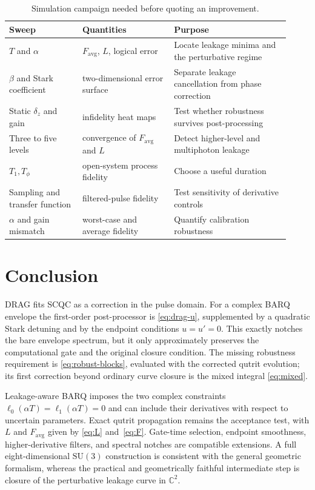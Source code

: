 \documentclass[11pt,a4paper]{article}
\theoremstyle{definition}
\begin{document}
\begin{table}[ht]
\centering
\caption{Simulation campaign needed before quoting an improvement.}
\label{tab:campaign}
{\small
\begin{tabular}{@{}>{\raggedright\arraybackslash}p{0.24\linewidth}>{\raggedright\arraybackslash}p{0.30\linewidth}>{\raggedright\arraybackslash}p{0.38\linewidth}@{}}
\toprule
Sweep & Quantities & Purpose \\
\midrule
\(T\) and \(\alpha\) & \(F_{\mathrm{avg}}\), \(L\), logical error &
  Locate leakage minima and the perturbative regime \\
\(\beta\) and Stark coefficient & two-dimensional error surface &
  Separate leakage cancellation from phase correction \\
Static \(\delta_z\) and gain & infidelity heat maps &
  Test whether robustness survives post-processing \\
Three to five levels & convergence of \(F_{\mathrm{avg}}\) and \(L\) &
  Detect higher-level and multiphoton leakage \\
\(T_1,T_\phi\) & open-system process fidelity &
  Choose a useful duration \\
Sampling and transfer function & filtered-pulse fidelity &
  Test sensitivity of derivative controls \\
\(\alpha\) and gain mismatch & worst-case and average fidelity &
  Quantify calibration robustness \\
\bottomrule
\end{tabular}}
\end{table}

\section{Conclusion}

DRAG fits SCQC as a correction in the pulse domain.  For a complex BARQ
envelope the first-order post-processor is \eqref{eq:drag-u}, supplemented by
a quadratic Stark detuning and by the endpoint conditions \(u=u'=0\).  This
exactly notches the bare envelope spectrum, but it only approximately preserves
the computational gate and the original closure condition.  The missing
robustness requirement is \eqref{eq:robust-blocks}, evaluated with the
corrected qutrit evolution; its first correction beyond ordinary curve closure
is the mixed integral \eqref{eq:mixed}.

Leakage-aware BARQ imposes the two complex constraints
\(\ell_0(\alpha T)=\ell_1(\alpha T)=0\) and can include their derivatives with
respect to uncertain parameters.  Exact qutrit propagation remains the
acceptance test, with \(L\) and \(F_{\mathrm{avg}}\) given by \eqref{eq:L}
and~\eqref{eq:F}.  Gate-time selection, endpoint smoothness, higher-derivative
filters, and spectral notches are compatible extensions.  A full
eight-dimensional \(\mathrm{SU}(3)\) construction is consistent with the
general geometric formalism, whereas the practical and geometrically faithful
intermediate step is closure of the perturbative leakage curve in
\(\mathbb{C}^2\).
\end{document}
